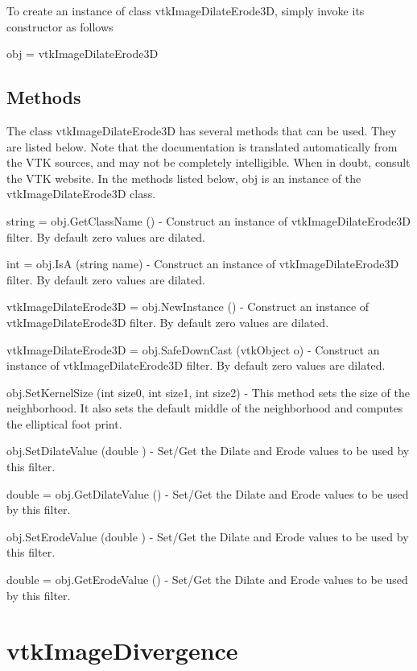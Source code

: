 To create an instance of class vtk\-Image\-Dilate\-Erode3\-D, simply invoke its constructor as follows \begin{DoxyVerb}  obj = vtkImageDilateErode3D
\end{DoxyVerb}
 \hypertarget{vtkwidgets_vtkxyplotwidget_Methods}{}\subsection{Methods}\label{vtkwidgets_vtkxyplotwidget_Methods}
The class vtk\-Image\-Dilate\-Erode3\-D has several methods that can be used. They are listed below. Note that the documentation is translated automatically from the V\-T\-K sources, and may not be completely intelligible. When in doubt, consult the V\-T\-K website. In the methods listed below, {\ttfamily obj} is an instance of the vtk\-Image\-Dilate\-Erode3\-D class. 
\begin{DoxyItemize}
\item {\ttfamily string = obj.\-Get\-Class\-Name ()} -\/ Construct an instance of vtk\-Image\-Dilate\-Erode3\-D filter. By default zero values are dilated.  
\item {\ttfamily int = obj.\-Is\-A (string name)} -\/ Construct an instance of vtk\-Image\-Dilate\-Erode3\-D filter. By default zero values are dilated.  
\item {\ttfamily vtk\-Image\-Dilate\-Erode3\-D = obj.\-New\-Instance ()} -\/ Construct an instance of vtk\-Image\-Dilate\-Erode3\-D filter. By default zero values are dilated.  
\item {\ttfamily vtk\-Image\-Dilate\-Erode3\-D = obj.\-Safe\-Down\-Cast (vtk\-Object o)} -\/ Construct an instance of vtk\-Image\-Dilate\-Erode3\-D filter. By default zero values are dilated.  
\item {\ttfamily obj.\-Set\-Kernel\-Size (int size0, int size1, int size2)} -\/ This method sets the size of the neighborhood. It also sets the default middle of the neighborhood and computes the elliptical foot print.  
\item {\ttfamily obj.\-Set\-Dilate\-Value (double )} -\/ Set/\-Get the Dilate and Erode values to be used by this filter.  
\item {\ttfamily double = obj.\-Get\-Dilate\-Value ()} -\/ Set/\-Get the Dilate and Erode values to be used by this filter.  
\item {\ttfamily obj.\-Set\-Erode\-Value (double )} -\/ Set/\-Get the Dilate and Erode values to be used by this filter.  
\item {\ttfamily double = obj.\-Get\-Erode\-Value ()} -\/ Set/\-Get the Dilate and Erode values to be used by this filter.  
\end{DoxyItemize}\hypertarget{vtkimaging_vtkimagedivergence}{}\section{vtk\-Image\-Divergence}\label{vtkimaging_vtkimagedivergence}
